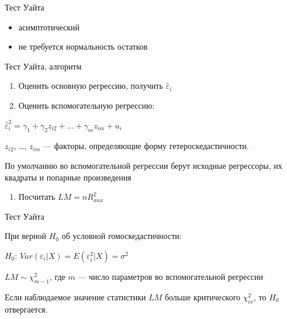 \documentclass[ignorenonframetext,]{beamer}
\newcommand{\e}{\varepsilon}
\begin{document}
\begin{frame}{Тест Уайта}

\begin{itemize}
\item
  асимптотический
\item
  не требуется нормальность остатков
\end{itemize}

\end{frame}

\begin{frame}{Тест Уайта, алгоритм}

\begin{enumerate}
\def\labelenumi{\arabic{enumi}.}
\item
  Оценить основную регрессию, получить $\hat{\varepsilon}_i$
\item
  Оценить вспомогательную регрессию:
\end{enumerate}

$\hat{\varepsilon}^2_i = \gamma_1 + \gamma_2 z_{i2} + \ldots + \gamma_{m} z_{im}+ u_i$

$z_{i2}$, \ldots, $z_{im}$ --- факторы, определяющие форму
гетероскедастичности.

По умолчанию во вспомогательной регрессии берут исходные регрессоры, их
квадраты и попарные произведения

\begin{enumerate}
\def\labelenumi{\arabic{enumi}.}
\setcounter{enumi}{2}
\itemsep1pt\parskip0pt
\item
  Посчитать $LM=nR^2_{aux}$
\end{enumerate}

\end{frame}

\begin{frame}{Тест Уайта}

При верной $H_0$ об условной гомоскедастичности:

$H_0$: $Var(\e_i|X)=E(\varepsilon^2_i|X)=\sigma^2$

$LM \sim \chi^2_{m-1}$, где $m$ --- число параметров во вспомогательной
регрессии

Если наблюдаемое значение статистики $LM$ больше критического
$\chi^2_{cr}$, то $H_0$ отвергается.

\end{frame}
\end{document}
